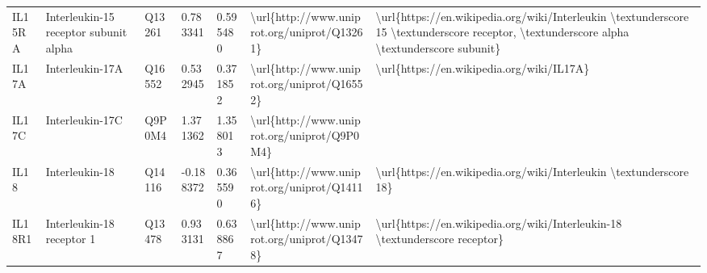 \begin{table}[]
\begin{tabular}{lllllll}
\multicolumn{1}{l|}{IL15RA}   & Interleukin-15 receptor subunit alpha                         & Q13261  & 0.783341           & 0.595480          & \textbackslash{}url\{http://www.uniprot.org/uniprot/Q13261\} & \textbackslash{}url\{https://en.wikipedia.org/wiki/Interleukin \textbackslash{}textunderscore 15 \textbackslash{}textunderscore receptor, \textbackslash{}textunderscore alpha \textbackslash{}textunderscore subunit\}                                                                            \\
\multicolumn{1}{l|}{IL17A}    & Interleukin-17A                                               & Q16552  & 0.532945           & 0.371852          & \textbackslash{}url\{http://www.uniprot.org/uniprot/Q16552\} & \textbackslash{}url\{https://en.wikipedia.org/wiki/IL17A\}                                                                                                                                                                                                                                         \\
\multicolumn{1}{l|}{IL17C}    & Interleukin-17C                                               & Q9P0M4  & 1.371362           & 1.358013          & \textbackslash{}url\{http://www.uniprot.org/uniprot/Q9P0M4\} &                                                                                                                                                                                                                                                                                                    \\
\multicolumn{1}{l|}{IL18}     & Interleukin-18                                                & Q14116  & -0.188372          & 0.365590          & \textbackslash{}url\{http://www.uniprot.org/uniprot/Q14116\} & \textbackslash{}url\{https://en.wikipedia.org/wiki/Interleukin \textbackslash{}textunderscore 18\}                                                                                                                                                                                                 \\
\multicolumn{1}{l|}{IL18R1}   & Interleukin-18 receptor 1                                     & Q13478  & 0.933131           & 0.638867          & \textbackslash{}url\{http://www.uniprot.org/uniprot/Q13478\} & \textbackslash{}url\{https://en.wikipedia.org/wiki/Interleukin-18 \textbackslash{}textunderscore receptor\}                                                                                                                                                                                        \\

\end{tabular}
\end{table}
